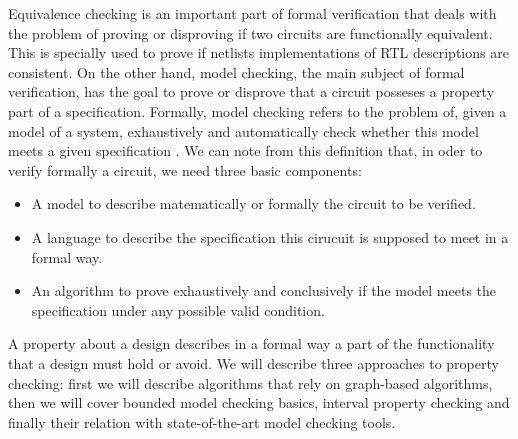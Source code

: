\documentclass[a4paper,11pt]{article}
\begin{document}
Equivalence checking is an important part of formal verification that deals with the problem of proving or disproving if two circuits are functionally equivalent. This is specially used to prove if netlists implementations of RTL descriptions are consistent.
On the other hand, model checking, the main subject of formal verification, has the goal to prove or disprove that a circuit posseses a property part of a specification. Formally, model checking refers to the problem of, given a model of a system, exhaustively and automatically check whether this model meets a given specification \cite{clarke:birth_model_checking}. We can note from this definition that, in oder to verify formally a circuit, we need three basic components:
\begin{itemize}
\item A model to describe matematically or formally the circuit to be verified.
\item A language to describe the specification this cirucuit is supposed to meet in a formal way.
\item An algorithm to prove exhaustively and conclusively if the model meets the specification under any possible valid condition.
\end{itemize}
A property about a design describes in a formal way a part of the functionality that a design must hold or avoid. We will describe three approaches to property checking: first we will describe algorithms that rely on graph-based algorithms, then we will cover bounded model checking basics, interval property checking and finally their relation with state-of-the-art model checking tools. 
\end{document}
